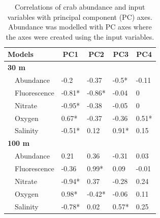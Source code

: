 \documentclass[letterpaper,12pt]{article}\usepackage[]{graphicx}\usepackage[]{color}
\begin{document}
\begin{landscape}
\centering\vspace*{\fill}
\begin{table}[!tbp]
\caption{Correlations of crab abundance and input variables with principal component (PC) axes. Abundance was modelled with PC axes where the axes were created using the input variables.\label{tab:pcacor}} 
\begin{center}
\begin{tabular}{lllll}
\hline\hline
\multicolumn{1}{l}{Models}&\multicolumn{1}{c}{PC1}&\multicolumn{1}{c}{PC2}&\multicolumn{1}{c}{PC3}&\multicolumn{1}{c}{PC4}\tabularnewline
\hline
{\bfseries 30 m}&&&&\tabularnewline
~~Abundance&-0.2&-0.37&-0.5*&-0.11\tabularnewline
~~Fluorescence&-0.81*&-0.86*&-0.04&0\tabularnewline
~~Nitrate&-0.95*&-0.38&-0.05&0\tabularnewline
~~Oxygen&0.67*&-0.37&-0.36&0.51*\tabularnewline
~~Salinity&-0.51*&0.12&0.91*&0.15\tabularnewline
\hline
{\bfseries 100 m}&&&&\tabularnewline
~~Abundance&0.21&0.36&-0.31&0.03\tabularnewline
~~Fluorescence&-0.36&0.99*&0.09&-0.01\tabularnewline
~~Nitrate&-0.94*&0.37&-0.28&0.24\tabularnewline
~~Oxygen&0.98*&-0.42*&-0.06&0.11\tabularnewline
~~Salinity&-0.78*&0.02&0.57*&0.25\tabularnewline
\hline
\end{tabular}\end{center}
\end{table}

\end{landscape}
\end{document}
